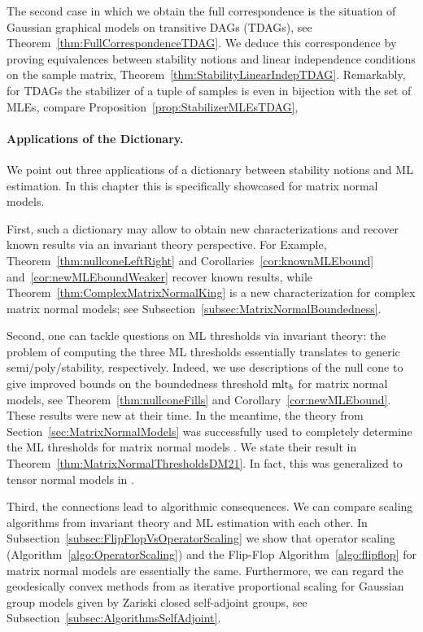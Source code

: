 The second case in which we obtain the full correspondence is the situation of Gaussian graphical models on transitive DAGs (TDAGs), see Theorem~\ref{thm:FullCorrespondenceTDAG}. We deduce this correspondence by proving equivalences between stability notions and linear independence conditions on the sample matrix, Theorem~\ref{thm:StabilityLinearIndepTDAG}. Remarkably, for TDAGs the stabilizer of a tuple of samples is even in bijection with the set of MLEs, compare Proposition~\ref{prop:StabilizerMLEsTDAG}, 


\paragraph{Applications of the Dictionary.}
We point out three applications of a dictionary between stability notions and ML estimation. In this chapter this is specifically showcased for matrix normal models.

First, such a dictionary may allow to obtain new characterizations and recover known results via an invariant theory perspective. For Example, Theorem~\ref{thm:nullconeLeftRight} and Corollaries~\ref{cor:knownMLEbound} and~\ref{cor:newMLEboundWeaker} recover known results, while Theorem~\ref{thm:ComplexMatrixNormalKing} is a new characterization for complex matrix normal models; see Subsection~\ref{subsec:MatrixNormalBoundedness}.

Second, one can tackle questions on ML thresholds via invariant theory: the problem of computing the three ML thresholds essentially translates to generic semi/poly/stability, respectively.
Indeed, we use descriptions of the null cone to give improved bounds on the boundedness threshold $\operatorname{mlt}_b$ for matrix normal models, see Theorem~\ref{thm:nullconeFills} and Corollary~\ref{cor:newMLEbound}. These results were new at their time. In the meantime, the theory from Section~\ref{sec:MatrixNormalModels} was successfully used to completely determine the ML thresholds for matrix normal models \cite{DM21MatrixNormal}. We state their result in Theorem~\ref{thm:MatrixNormalThresholdsDM21}. In fact, this was generalized to tensor normal models in \cite{DMW22TensorNormal}.

Third, the connections lead to algorithmic consequences. We can compare scaling algorithms from invariant theory and ML estimation with each other. In Subsection~\ref{subsec:FlipFlopVsOperatorScaling} we show that operator scaling (Algorithm~\ref{algo:OperatorScaling}) and the Flip-Flop Algorithm~\ref{algo:flipflop} for matrix normal models are essentially the same.
Furthermore, we can regard the geodesically convex methods from \cite{GradflowArXiv} as iterative proportional scaling for Gaussian group models given by Zariski closed self-adjoint groups, see Subsection~\ref{subsec:AlgorithmsSelfAdjoint}.





